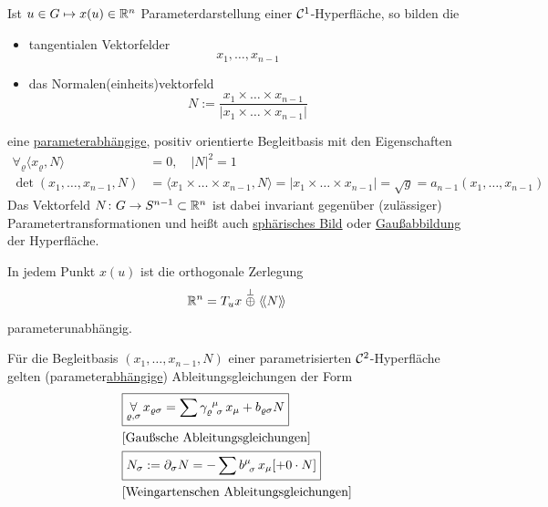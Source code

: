 \begin{satz}\label{satz212}
 Ist \(u \in G \mapsto x(u) \in \mathbb{R}^n\) Parameterdarstellung einer \(\mathcal{C}^1\)-Hyperfläche, so bilden die 
 \begin{itemize}
  \item tangentialen Vektorfelder
  \[
   x_1, \dots, x_{n-1}
  \]
  \item das Normalen(einheits)vektorfeld
  \[
   N := \frac{x_1 \times \dots \times x_{n-1}}{|x_1 \times \dots \times x_{n-1}|}
  \]
 \end{itemize}
 eine \uline{parameterabhängige}, positiv orientierte Begleitbasis mit den Eigenschaften
 \begin{align*}
  \forall_\varrho \langle x_\varrho, N \rangle &= 0, \quad |N|^2 = 1 \\
  \det (x_1, \dots, x_{n-1}, N) &= \langle x_1 \times \dots \times x_{n-1}, N \rangle = |x_1 \times \dots \times x_{n-1} | = \sqrt{g} = a_{n-1} (x_1, \dots, x_{n-1})
 \end{align*}
 Das Vektorfeld \(N \colon G \to S^{n-1} \subset \mathbb{R}^n\) ist dabei invariant gegenüber (zulässiger) Parametertransformationen und heißt auch \uline{sphärisches Bild} oder \uline{Gaußabbildung} der Hyperfläche.
\end{satz}

\begin{bemerkung}
 In jedem Punkt \(x(u)\) ist die orthogonale Zerlegung
 \[
  \mathbb{R}^n = T_u x \stackrel{\perp}{\oplus} \left\langle\!\left\langle N \right\rangle\!\right\rangle
 \]
 parameterunabhängig.
\end{bemerkung}

\begin{satz}\label{satz213}
 Für die Begleitbasis \((x_1, \dots, x_{n-1}, N)\) einer parametrisierten \(\mathcal{C}^2\)-Hyperfläche gelten (parameter\-\uline{abhängige}) Ableitungsgleichungen der Form 
 \begin{align*}
 &\boxed{\underset{\varrho, \sigma}{\forall}\, x_{\varrho \sigma} = \sum \gamma_{\varrho \;\, \sigma}^{\;\,\mu}\, x_\mu + b_{\varrho \sigma} N} \\
 &\text{[Gaußsche Ableitungsgleichungen]\index{Gaußsche Ableitungsgleichungen]}} \\
 &\boxed{N_\sigma := \partial_\sigma N = - \sum b^\mu_{\;\, \sigma}\, x_\mu [ + 0 \cdot N]} \\
 &\text{[Weingartenschen Ableitungsgleichungen]\index{Weingartenschen Ableitungsgleichungen}}
 \end{align*}
\end{satz}

